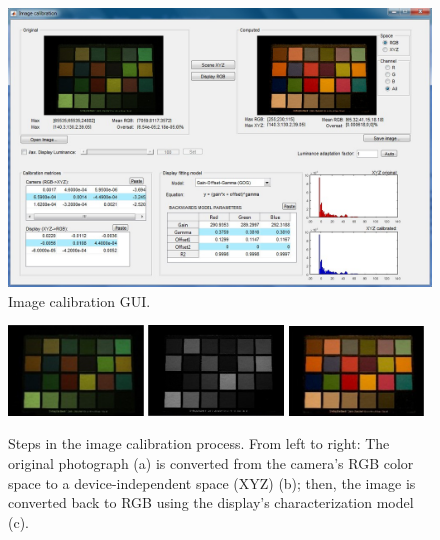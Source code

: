 \documentclass[a4paper,12pt,oneside]{article}
\begin{document}
\begin{figure}[hp]
	\centering
	\includegraphics[width=1\textwidth]{images/image_calibration1.jpg}
	\caption{Image calibration GUI.}
	\label{fig:image_calibration_gui}
\end{figure}

\begin{figure}[hp]
	\centering
	\includegraphics[width=0.32\textwidth]{images/im_calib_step1.jpg}
	\includegraphics[width=0.32\textwidth]{images/im_calib_step2.jpg}
	\includegraphics[width=0.32\textwidth]{images/im_calib_step3.jpg}
	\caption{Steps in the image calibration process. From left to right: The original photograph (a) is converted from the camera's RGB color space to a device-independent space (XYZ) (b); then, the image is converted back to RGB using the display's characterization model (c).}
	\label{fig:image_calibration_workflow}
\end{figure}
\end{document}
